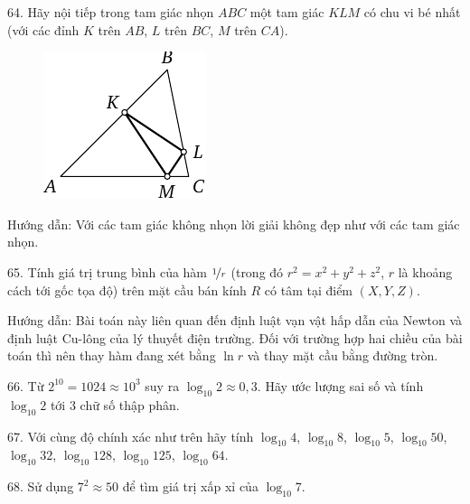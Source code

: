 \begin{problem}{64.}
	Hãy nội tiếp trong tam giác nhọn $ABC$ một tam giác $KLM$ có chu vi bé nhất (với các đỉnh $K$ trên $AB$, $L$ trên $BC$, $M$ trên $CA$).

	\begin{figure}
		\centering\includegraphics{resources/taskbook-48}
	\end{figure}

	\begin{note}{Hướng dẫn:}
		Với các tam giác không nhọn lời giải không đẹp như với các tam giác nhọn.
	\end{note}
\end{problem}

\begin{problem}{65.}
	Tính giá trị trung bình của hàm $\nicefrac{1}{r}$ (trong đó $r^2=x^2+y^2+z^2$, $r$ là khoảng cách tới gốc tọa độ) trên mặt cầu bán kính $R$ có tâm tại điểm $(X,Y,Z)$.

	\begin{note}{Hướng dẫn:}
		Bài toán này liên quan đến định luật vạn vật hấp dẫn của Newton và định luật Cu-lông của lý thuyết điện trường. Đối với trường hợp hai chiều của bài toán thì nên thay hàm đang xét bằng $\ln r$ và thay mặt cầu bằng đường tròn.
	\end{note}
\end{problem}

\begin{problem}{66.}
	Từ $2^{10}=1024 \approx 10^3$ suy ra $\log_{10} 2\approx 0,3$. Hãy ước lượng sai số và tính $\log_{10} 2$ tới $3$ chữ số thập phân.
\end{problem}

\begin{problem}{67.}
	Với cùng độ chính xác như trên hãy tính $\log_{10} 4$, $\log_{10} 8$, $\log_{10} 5$, $\log_{10} 50$, $\log_{10} 32$, $\log_{10} 128$, $\log_{10} 125$, $\log_{10} 64$.
\end{problem}

\begin{problem}{68.}
	Sử dụng $7^2\approx 50$ để tìm giá trị xấp xỉ của $\log_{10} 7$.
\end{problem}


